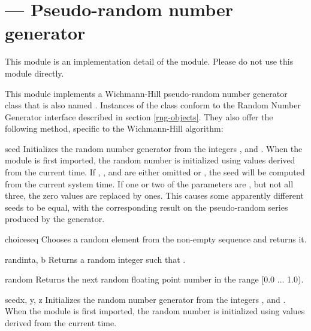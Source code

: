 \section{ ---
         Pseudo-random number generator}


  This module is an implementation detail of the
 module.  Please do not use this module directly.

This module implements a Wichmann-Hill pseudo-random number generator
class that is also named .  Instances of the
 class conform to the Random Number Generator
interface described in section \ref{rng-objects}.  They also offer the 
following method, specific to the Wichmann-Hill algorithm:

\begin{methoddesc}[whrandom]{seed}{}
  Initializes the random number generator from the integers ,
   and .  When the module is first imported, the random
  number is initialized using values derived from the current time.
  If , , and  are either omitted or , the 
  seed will be computed from the current system time.  If one or two
  of the parameters are , but not all three, the zero values
  are replaced by ones.  This causes some apparently different seeds
  to be equal, with the corresponding result on the pseudo-random
  series produced by the generator.
\end{methoddesc}

\begin{funcdesc}{choice}{seq}
Chooses a random element from the non-empty sequence  and returns it.
\end{funcdesc}

\begin{funcdesc}{randint}{a, b}
Returns a random integer  such that .
\end{funcdesc}

\begin{funcdesc}{random}{}
Returns the next random floating point number in the range [0.0 ... 1.0).
\end{funcdesc}

\begin{funcdesc}{seed}{x, y, z}
Initializes the random number generator from the integers ,
 and .  When the module is first imported, the random
number is initialized using values derived from the current time.
\end{funcdesc}

